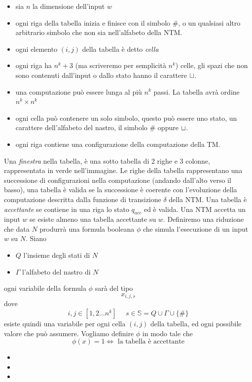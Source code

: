 \documentclass[10pt, letterpaper]{report}
\begin{document}
\begin{itemize}
    \item sia $n$ la dimensione dell'input $w$
    \item ogni riga della tabella inizia e finisce con il simbolo $\#$, o un qualsiasi altro arbitrario simbolo che non sia nell'alfabeto della NTM. 
    \item ogni elemento $(i,j)$ della tabella è detto \textit{cella}
    \item ogni riga ha $n^k+3$ (ma scriveremo per semplicità $n^k$) celle, gli spazi che non sono contenuti dall'input o dallo stato hanno il carattere ${\sqcup}$.\item una computazione può essere lunga al più $n^k$ passi. La tabella avrà ordine $n^k\times n^k$
    \item ogni cella può contenere un solo simbolo, questo può essere uno stato, un carattere dell'alfabeto del nastro, il simbolo $\#$ oppure ${\sqcup}$.
    \item ogni riga contiene una configurazione della computazione della TM.
\end{itemize}
Una \textit{finestra} nella tabella, è una sotto tabella di 2 righe e 3 colonne, rappresentata in verde nell'immagine.\acc 
Le righe della tabella rappresentano una successione di configurazioni nella computazione (andando dall'alto verso il basso), una tabella è valida se la successione è coerente con l'evoluzione della computazione descritta dalla funzione di transizione $\delta$ della NTM.\acc 
Una tabella è \textit{accettante} se contiene in una riga lo stato $q_{acc}$ ed è valida. Una NTM accetta un input $w$ se esiste almeno una tabella accettante su $w$.\acc 
Definiremo una riduzione che data $N$ produrrà una formula booleana $\phi$ che simula l'esecuzione di un input $w$ su $N$. Siano \begin{itemize}
    \item $Q$ l'insieme degli stati di $N$
    \item $\Gamma$ l'alfabeto del nastro di $N$
\end{itemize}
ogni variabile della formula $\phi$ sarà del tipo 
$$ x_{i,j,s}$$
dove 
$$ i,j \in [1,2\dots n^k] \ \ \ \ \ \ s\in\mathbb S = Q\cup \Gamma \cup \{\#\}$$
esiste quindi una variabile per ogni cella $(i,j)$ della tabella, ed ogni possibile valore che può assumere. Vogliamo definire $\phi$ in modo tale che $$ \phi(x)=1\iff \text{ la tabella è accettante}$$
\begin{itemize}
    \item {}
    \item {}
    \item {}
\end{itemize}
\end{document}
